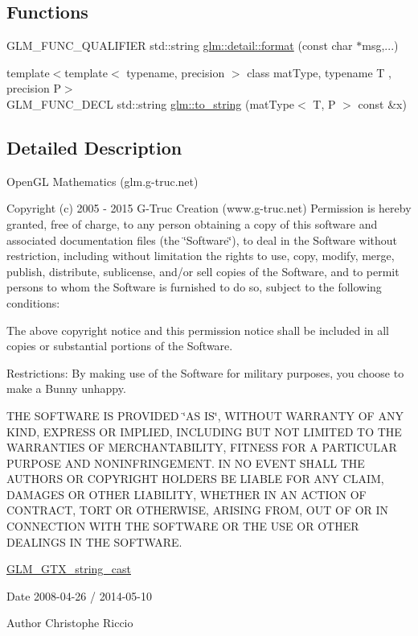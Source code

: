 \subsection*{Functions}
\begin{DoxyCompactItemize}
\item 
G\+L\+M\+\_\+\+F\+U\+N\+C\+\_\+\+Q\+U\+A\+L\+I\+F\+I\+E\+R std\+::string \hyperlink{namespaceglm_1_1detail_acd5305bbd1c5417b1eb770faf8229d14}{glm\+::detail\+::format} (const char $\ast$msg,...)
\item 
{\footnotesize template$<$template$<$ typename, precision $>$ class mat\+Type, typename T , precision P$>$ }\\G\+L\+M\+\_\+\+F\+U\+N\+C\+\_\+\+D\+E\+C\+L std\+::string \hyperlink{group__gtx__string__cast_ga7b4f9233593bbf1d53762f801ef56fe6}{glm\+::to\+\_\+string} (mat\+Type$<$ T, P $>$ const \&x)
\end{DoxyCompactItemize}


\subsection{Detailed Description}
Open\+G\+L Mathematics (glm.\+g-\/truc.\+net)

Copyright (c) 2005 -\/ 2015 G-\/\+Truc Creation (www.\+g-\/truc.\+net) Permission is hereby granted, free of charge, to any person obtaining a copy of this software and associated documentation files (the \char`\"{}\+Software\char`\"{}), to deal in the Software without restriction, including without limitation the rights to use, copy, modify, merge, publish, distribute, sublicense, and/or sell copies of the Software, and to permit persons to whom the Software is furnished to do so, subject to the following conditions\+:

The above copyright notice and this permission notice shall be included in all copies or substantial portions of the Software.

Restrictions\+: By making use of the Software for military purposes, you choose to make a Bunny unhappy.

T\+H\+E S\+O\+F\+T\+W\+A\+R\+E I\+S P\+R\+O\+V\+I\+D\+E\+D \char`\"{}\+A\+S I\+S\char`\"{}, W\+I\+T\+H\+O\+U\+T W\+A\+R\+R\+A\+N\+T\+Y O\+F A\+N\+Y K\+I\+N\+D, E\+X\+P\+R\+E\+S\+S O\+R I\+M\+P\+L\+I\+E\+D, I\+N\+C\+L\+U\+D\+I\+N\+G B\+U\+T N\+O\+T L\+I\+M\+I\+T\+E\+D T\+O T\+H\+E W\+A\+R\+R\+A\+N\+T\+I\+E\+S O\+F M\+E\+R\+C\+H\+A\+N\+T\+A\+B\+I\+L\+I\+T\+Y, F\+I\+T\+N\+E\+S\+S F\+O\+R A P\+A\+R\+T\+I\+C\+U\+L\+A\+R P\+U\+R\+P\+O\+S\+E A\+N\+D N\+O\+N\+I\+N\+F\+R\+I\+N\+G\+E\+M\+E\+N\+T. I\+N N\+O E\+V\+E\+N\+T S\+H\+A\+L\+L T\+H\+E A\+U\+T\+H\+O\+R\+S O\+R C\+O\+P\+Y\+R\+I\+G\+H\+T H\+O\+L\+D\+E\+R\+S B\+E L\+I\+A\+B\+L\+E F\+O\+R A\+N\+Y C\+L\+A\+I\+M, D\+A\+M\+A\+G\+E\+S O\+R O\+T\+H\+E\+R L\+I\+A\+B\+I\+L\+I\+T\+Y, W\+H\+E\+T\+H\+E\+R I\+N A\+N A\+C\+T\+I\+O\+N O\+F C\+O\+N\+T\+R\+A\+C\+T, T\+O\+R\+T O\+R O\+T\+H\+E\+R\+W\+I\+S\+E, A\+R\+I\+S\+I\+N\+G F\+R\+O\+M, O\+U\+T O\+F O\+R I\+N C\+O\+N\+N\+E\+C\+T\+I\+O\+N W\+I\+T\+H T\+H\+E S\+O\+F\+T\+W\+A\+R\+E O\+R T\+H\+E U\+S\+E O\+R O\+T\+H\+E\+R D\+E\+A\+L\+I\+N\+G\+S I\+N T\+H\+E S\+O\+F\+T\+W\+A\+R\+E.

\hyperlink{group__gtx__string__cast}{G\+L\+M\+\_\+\+G\+T\+X\+\_\+string\+\_\+cast}

\begin{DoxyDate}{Date}
2008-\/04-\/26 / 2014-\/05-\/10 
\end{DoxyDate}
\begin{DoxyAuthor}{Author}
Christophe Riccio 
\end{DoxyAuthor}
